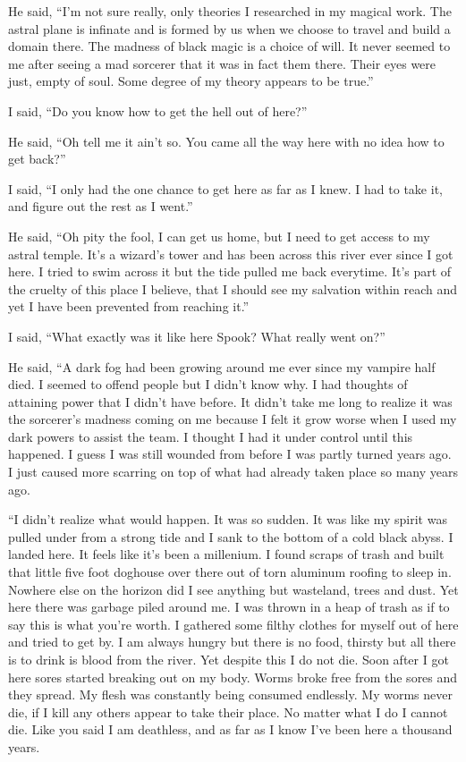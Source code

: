 He said, ``I'm not sure really, only theories I researched in my magical work. The astral plane is infinate and is formed by us when we choose to travel and build a domain there. The madness of black magic is a choice of will. It never seemed to me after seeing a mad sorcerer that it was in fact them there. Their eyes were just, empty of soul. Some degree of my theory appears to be true.''

I said, ``Do you know how to get the hell out of here?''

He said, ``Oh tell me it ain't so. You came all the way here with no idea how to get back?''

I said, ``I only had the one chance to get here as far as I knew. I had to take it, and figure out the rest as I went.''

He said, ``Oh pity the fool, I can get us home, but I need to get access to my astral temple. It's a wizard's tower and has been across this river ever since I got here. I tried to swim across it but the tide pulled me back everytime. It's part of the cruelty of this place I believe, that I should see my salvation within reach and yet I have been prevented from reaching it.''

I said, ``What exactly was it like here Spook? What really went on?''

He said, ``A dark fog had been growing around me ever since my vampire half died. I seemed to offend people but I didn't know why. I had thoughts of attaining power that I didn't have before. It didn't take me long to realize it was the sorcerer's madness coming on me because I felt it grow worse when I used my dark powers to assist the team. I thought I had it under control until this happened. I guess I was still wounded from before I was partly turned years ago. I just caused more scarring on top of what had already taken place so many years ago.

``I didn't realize what would happen. It was so sudden. It was like my spirit was pulled under from a strong tide and I sank to the bottom of a cold black abyss. I landed here. It feels like it's been a millenium. I found scraps of trash and built that little five foot doghouse over there out of torn aluminum roofing to sleep in. Nowhere else on the horizon did I see anything but wasteland, trees and dust. Yet here there was garbage piled around me. I was thrown in a heap of trash as if to say this is what you're worth. I gathered some filthy clothes for myself out of here and tried to get by. I am always hungry but there is no food, thirsty but all there is to drink is blood from the river. Yet despite this I do not die. Soon after I got here sores started breaking out on my body. Worms broke free from the sores and they spread. My flesh was constantly being consumed endlessly. My worms never die, if I kill any others appear to take their place. No matter what I do I cannot die. Like you said I am deathless, and as far as I know I've been here a thousand years.

